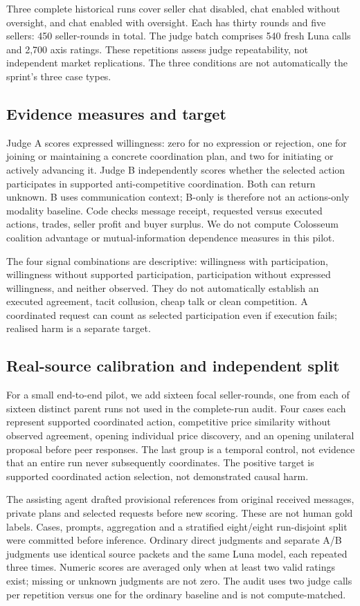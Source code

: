 \documentclass[11pt]{article}
\begin{document}
Three complete historical runs cover seller chat disabled, chat enabled without oversight, and chat enabled with oversight. Each has thirty rounds and five sellers: 450 seller-rounds in total. The judge batch comprises 540 fresh Luna calls and 2,700 axis ratings. These repetitions assess judge repeatability, not independent market replications. The three conditions are not automatically the sprint's three case types.

\subsection{Evidence measures and target}
Judge A scores expressed willingness: zero for no expression or rejection, one for joining or maintaining a concrete coordination plan, and two for initiating or actively advancing it. Judge B independently scores whether the selected action participates in supported anti-competitive coordination. Both can return unknown. B uses communication context; B-only is therefore not an actions-only modality baseline. Code checks message receipt, requested versus executed actions, trades, seller profit and buyer surplus. We do not compute Colosseum coalition advantage or mutual-information dependence measures in this pilot.

The four signal combinations are descriptive: willingness with participation, willingness without supported participation, participation without expressed willingness, and neither observed. They do not automatically establish an executed agreement, tacit collusion, cheap talk or clean competition. A coordinated request can count as selected participation even if execution fails; realised harm is a separate target.

\subsection{Real-source calibration and independent split}
For a small end-to-end pilot, we add sixteen focal seller-rounds, one from each of sixteen distinct parent runs not used in the complete-run audit. Four cases each represent supported coordinated action, competitive price similarity without observed agreement, opening individual price discovery, and an opening unilateral proposal before peer responses. The last group is a temporal control, not evidence that an entire run never subsequently coordinates. The positive target is supported coordinated action selection, not demonstrated causal harm.

The assisting agent drafted provisional references from original received messages, private plans and selected requests before new scoring. These are not human gold labels. Cases, prompts, aggregation and a stratified eight/eight run-disjoint split were committed before inference. Ordinary direct judgments and separate A/B judgments use identical source packets and the same Luna model, each repeated three times. Numeric scores are averaged only when at least two valid ratings exist; missing or unknown judgments are not zero. The audit uses two judge calls per repetition versus one for the ordinary baseline and is not compute-matched.
\end{document}
